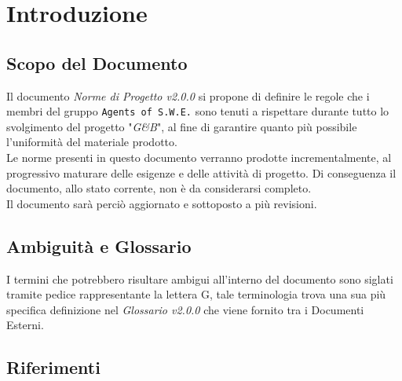 \section{Introduzione}\label{Intro}

\subsection{Scopo del Documento}
Il documento \textit{Norme di Progetto v2.0.0} si propone di definire le regole che i membri del gruppo \texttt{Agents of S.W.E.} sono tenuti a rispettare durante tutto lo svolgimento del progetto "\textit{G\&B}", al fine di garantire quanto più possibile l'uniformità del materiale prodotto.\\
Le norme presenti in questo documento verranno prodotte incrementalmente, al progressivo maturare delle esigenze e delle attività di progetto. Di conseguenza il documento, allo stato corrente, non è da considerarsi completo.\\
Il documento sarà perciò aggiornato e sottoposto a più revisioni.

\subsection{Ambiguità e Glossario}
I termini che potrebbero risultare ambigui all'interno del documento sono siglati tramite pedice rappresentante la lettera \textmd{G}, tale terminologia trova una sua più specifica definizione nel \textit{Glossario v2.0.0} che viene fornito tra i Documenti Esterni.

\subsection{Riferimenti}
